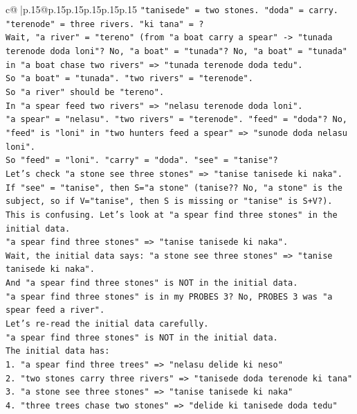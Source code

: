 \documentclass{article}
\begin{document}
{\begin{supertabular}{c@{$\;$}|p{.15\linewidth}@{}p{.15\linewidth}p{.15\linewidth}p{.15\linewidth}p{.15\linewidth}p{.15\linewidth}}
{{{\texttt{"tanisede" = two stones. "doda" = carry. "terenode" = three rivers. "ki tana" = ?} \\
\texttt{Wait, "a river" = "tereno" (from "a boat carry a spear" {-}> "tunada terenode doda loni"? No, "a boat" = "tunada"? No, "a boat" = "tunada" in "a boat chase two rivers" => "tunada terenode doda tedu".} \\
\texttt{So "a boat" = "tunada". "two rivers" = "terenode".} \\
\texttt{So "a river" should be "tereno".} \\
\texttt{In "a spear feed two rivers" => "nelasu terenode doda loni".} \\
\texttt{"a spear" = "nelasu". "two rivers" = "terenode". "feed" = "doda"? No, "feed" is "loni" in "two hunters feed a spear" => "sunode doda nelasu loni".} \\
\texttt{So "feed" = "loni". "carry" = "doda". "see" = "tanise"?} \\
\texttt{Let's check "a stone see three stones" => "tanise tanisede ki naka".} \\
\texttt{If "see" = "tanise", then S="a stone" (tanise?? No, "a stone" is the subject, so if V="tanise", then S is missing or "tanise" is S+V?).} \\
\texttt{This is confusing. Let's look at "a spear find three stones" in the initial data.} \\
\texttt{"a spear find three stones" => "tanise tanisede ki naka".} \\
\texttt{Wait, the initial data says: "a stone see three stones" => "tanise tanisede ki naka".} \\
\texttt{And "a spear find three stones" is NOT in the initial data.} \\
\texttt{"a spear find three stones" is in my PROBES 3? No, PROBES 3 was "a spear feed a river".} \\
\texttt{Let's re{-}read the initial data carefully.} \\
\texttt{"a spear find three stones" is NOT in the initial data.} \\
\texttt{The initial data has:} \\
\texttt{1. "a spear find three trees" => "nelasu delide ki neso"} \\
\texttt{2. "two stones carry three rivers" => "tanisede doda terenode ki tana"} \\
\texttt{3. "a stone see three stones" => "tanise tanisede ki naka"} \\
\texttt{4. "three trees chase two stones" => "delide ki tanisede doda tedu"} \\
}}}
\end{supertabular}}
\end{document}
